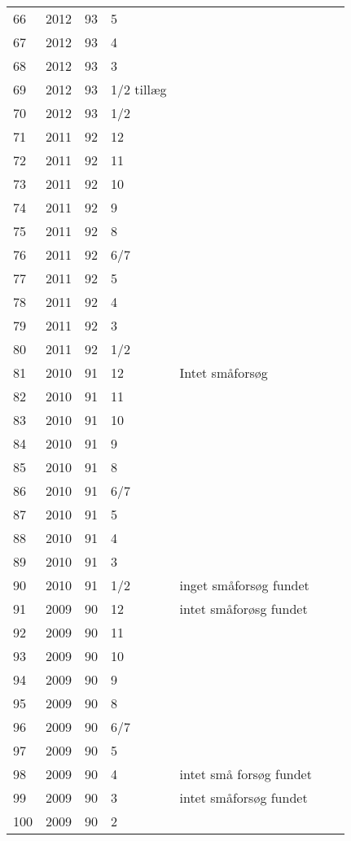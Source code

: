 \begin{longtable}{ |l|l|l|l|l|l|l| }
66 & 2012 & 93 & 5 &  &  &  \\
67 & 2012 & 93 & 4 &  &  &  \\
68 & 2012 & 93 & 3 &  &  &  \\
69 & 2012 & 93 & 1/2 tillæg &  &  &  \\
70 & 2012 & 93 & 1/2 &  &  &  \\
71 & 2011 & 92 & 12 &  &  &  \\
72 & 2011 & 92 & 11 &  &  &  \\
73 & 2011 & 92 & 10 &  &  &  \\
74 & 2011 & 92 & 9 &  &  &  \\
75 & 2011 & 92 & 8 &  &  &  \\
76 & 2011 & 92 & 6/7 &  &  &  \\
77 & 2011 & 92 & 5 &  &  &  \\
78 & 2011 & 92 & 4 &  &  &  \\
79 & 2011 & 92 & 3 &  &  &  \\
80 & 2011 & 92 & 1/2 &  &  &  \\
81 & 2010 & 91 & 12 & Intet småforsøg &  &  \\
82 & 2010 & 91 & 11 &  &  &  \\
83 & 2010 & 91 & 10 &  &  &  \\
84 & 2010 & 91 & 9 &  &  &  \\
85 & 2010 & 91 & 8 &  &  &  \\
86 & 2010 & 91 & 6/7 &  &  &  \\
87 & 2010 & 91 & 5 &  &  &  \\
88 & 2010 & 91 & 4 &  &  &  \\
89 & 2010 & 91 & 3 &  &  &  \\
90 & 2010 & 91 & 1/2 & inget småforsøg fundet &  &  \\
91 & 2009 & 90 & 12 & intet småforøsg fundet &  &  \\
92 & 2009 & 90 & 11 &  &  &  \\
93 & 2009 & 90 & 10 &  &  &  \\
94 & 2009 & 90 & 9 &  &  &  \\
95 & 2009 & 90 & 8 &  &  &  \\
96 & 2009 & 90 & 6/7 &  &  &  \\
97 & 2009 & 90 & 5 &  &  &  \\
98 & 2009 & 90 & 4 & intet små forsøg fundet &  &  \\
99 & 2009 & 90 & 3 & intet småforsøg fundet &  &  \\
100 & 2009 & 90 & 2 &  &  &  \\

\end{longtable}
